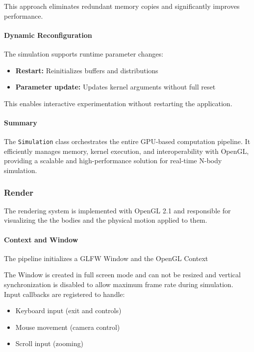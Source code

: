 \documentclass[12pt]{article}
\begin{document}
This approach eliminates redundant memory copies and significantly improves performance.

\paragraph{Dynamic Reconfiguration}

The simulation supports runtime parameter changes:

\begin{itemize}
    \item \textbf{Restart:} Reinitializes buffers and distributions
    \item \textbf{Parameter update:} Updates kernel arguments without full reset
\end{itemize}

This enables interactive experimentation without restarting the application.

\paragraph{Summary}

The \texttt{Simulation} class orchestrates the entire GPU-based computation pipeline.
It efficiently manages memory, kernel execution, and interoperability with OpenGL,
providing a scalable and high-performance solution for real-time N-body simulation.

\subsubsection{Render}

The rendering system is implemented with OpenGL 2.1 and responsible for visualizing
the the bodies and the physical motion applied to them.

\paragraph{Context and Window}
The pipeline initializes a GLFW Window and the OpenGL Context

The Window is created in full screen mode and can not be resized and
vertical synchronization is disabled to allow maximum frame rate during simulation.
Input callbacks are registered to handle:
\begin{itemize}
\item Keyboard input (exit and controls)
\item Mouse movement (camera control)
\item Scroll input (zooming)
\end{itemize}
\end{document}
